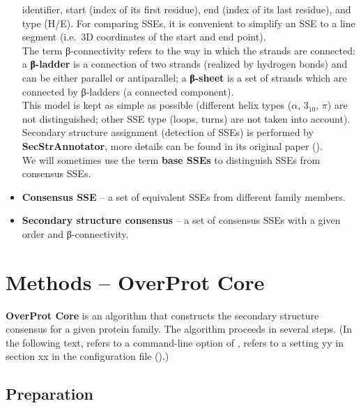 \documentclass{article}
\begin{document}
\begin{itemize}
    identifier, start (index of its first residue), end (index of its last
    residue), and type (H/E). For comparing SSEs, it is convenient to simplify
    an SSE to a line segment (i.e.~3D coordinates of the start and end
    point).\\
    The term β-connectivity refers to the way in which the strands are
    connected: a \textbf{β-ladder} is a connection of two strands (realized 
    by hydrogen bonds) and can be either parallel or antiparallel; 
    a \textbf{β-sheet} is a set of
    strands which are connected by β-ladders (a connected component).\\
    This model is kept as simple as possible (different helix types
    (\(\alpha\), \(3_{10}\), \(\pi\)) are not distinguished; other SSE
    type (loops, turns) are not taken into account). Secondary structure
    assignment (detection of SSEs) is performed by
    \textbf{SecStrAnnotator}, more details can be found in its original paper 
    ().\\
    We will sometimes use the term \textbf{base SSEs} to distinguish SSEs from consensus SSEs.
  \item
    \textbf{Consensus SSE} -- a set of equivalent SSEs from different
    family members. 
  \item
    \textbf{Secondary structure consensus} -- a set of consensus SSEs
    with a given order and β-connectivity.
\end{itemize}



\section{Methods -- OverProt Core}

\textbf{OverProt Core} is an algorithm that constructs the secondary
structure consensus for a given protein family. The algorithm proceeds
in several steps. 
(In the following text,  refers to a command-line option of ,
 refers to a setting yy in section xx in the configuration file ().)



\subsection{Preparation}
\end{document}
